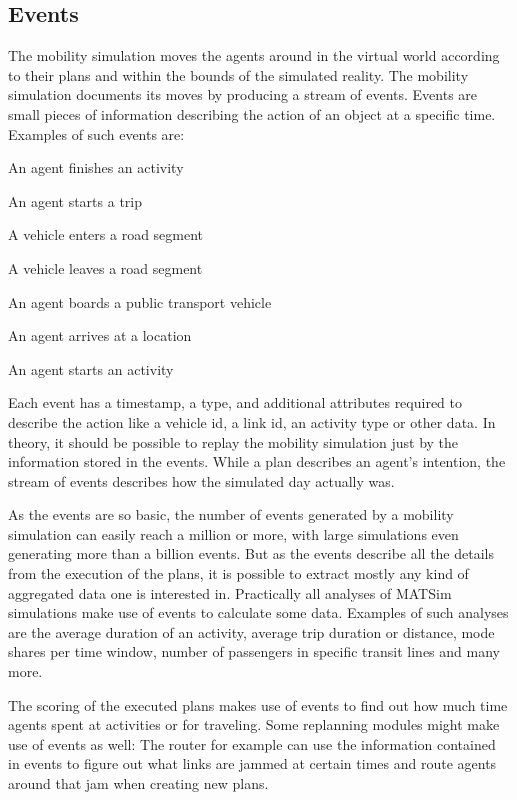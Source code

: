 \subsection{Events}
\label{sec:events-extension-point}
The mobility simulation moves the agents around in the virtual world according to their plans and within the bounds of the simulated reality. The mobility simulation documents its moves by producing a stream of events. Events are small pieces of information describing the action of an object at a specific time. Examples of such events are:
\begin{compactitem}
\item    An agent finishes an activity
\item     An agent starts a trip
\item    A vehicle enters a road segment
\item     A vehicle leaves a road segment
\item     An agent boards a public transport vehicle
\item     An agent arrives at a location
\item     An agent starts an activity
\end{compactitem}
%
Each event has a timestamp, a type, and additional attributes required to describe the action like a vehicle id, a link id, an activity type or other data. In theory, it should be possible to replay the mobility simulation just by the information stored in the events. While a plan 
describes an agent's intention, the stream of events describes how the simulated day actually was.

As the events are so basic, the number of events generated by a mobility simulation can easily reach a million or more, with large simulations even generating more than a billion events. But as the events describe all the details from the execution of the plans, it is possible to extract mostly any kind of aggregated data one is interested in. Practically all analyses of MATSim simulations make use of events to calculate some data. Examples of such analyses are the average duration of an activity, average trip duration or distance, mode shares per time window, number of passengers in specific transit lines and many more.

The scoring of the executed plans makes use of events to find out how much time agents spent at activities or for traveling. Some replanning modules might make use of events as well: The router for example can use the information contained in events to figure out what links are jammed at certain times and route agents around that jam when creating new plans.

